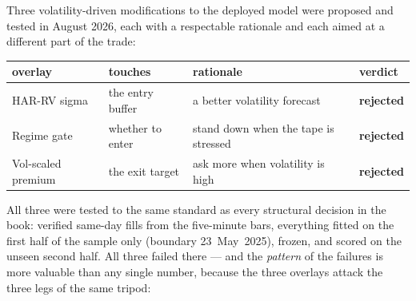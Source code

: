 \documentclass[11pt,a4paper]{article}
\newcommand{\bad}[1]{{\color{bcred}\textbf{#1}}}
\begin{document}
Three volatility-driven modifications to the deployed model were proposed and
tested in August 2026, each with a respectable rationale and each aimed at a
different part of the trade:

\begin{center}
\begin{tabular}{llll}
\toprule
overlay & touches & rationale & verdict \\
\midrule
HAR-RV sigma        & the entry buffer   & a better volatility forecast     & \bad{rejected} \\
Regime gate         & whether to enter   & stand down when the tape is stressed & \bad{rejected} \\
Vol-scaled premium  & the exit target    & ask more when volatility is high & \bad{rejected} \\
\bottomrule
\end{tabular}
\end{center}

All three were tested to the same standard as every structural decision in the
book: verified same-day fills from the five-minute bars, everything fitted on the
first half of the sample only (boundary 23~May~2025), frozen, and scored on the
unseen second half. All three failed there --- and the \emph{pattern} of the
failures is more valuable than any single number, because the three overlays
attack the three legs of the same tripod:
\end{document}
